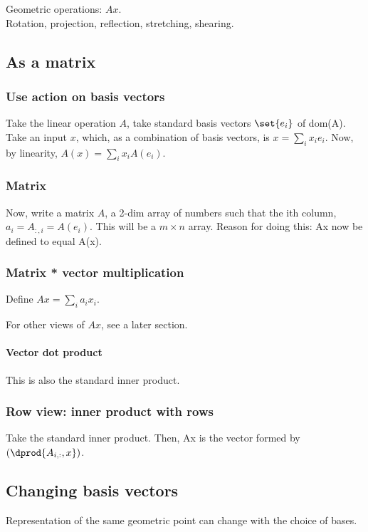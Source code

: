 \documentclass[oneside, article]{memoir}
\begin{document}
Geometric operations: $Ax$. \\
Rotation, projection, reflection, stretching, shearing.

\subsection{As a matrix}
\subsubsection{Use action on basis vectors}
Take the linear operation $A$, take standard basis vectors $\set{e_i}$ of dom(A). Take an input $x$, which, as a combination of basis vectors, is $x = \sum_i x_i e_i$. Now, by linearity, $A(x) = \sum_i x_i A(e_i)$.


\subsubsection{Matrix}
Now, write a matrix $A$, a 2-dim array of numbers such that the ith column, $a_i = A_{:,i} = A(e_i)$. This will be a $m \times n$ array. Reason for doing this: Ax now be defined to equal A(x).

\subsubsection{Matrix * vector multiplication}
Define $Ax = \sum_i a_i x_i$. 

For other views of $Ax$, see a later section.

\paragraph*{Vector dot product}
 This is also the standard inner product.

\subsubsection{Row view: inner product with rows}
Take the standard inner product. Then, Ax is the vector formed by $(\dprod{A_{i,:}, x})$.

\subsection{Changing basis vectors}
Representation of the same geometric point can change with the choice of bases.
\end{document}
